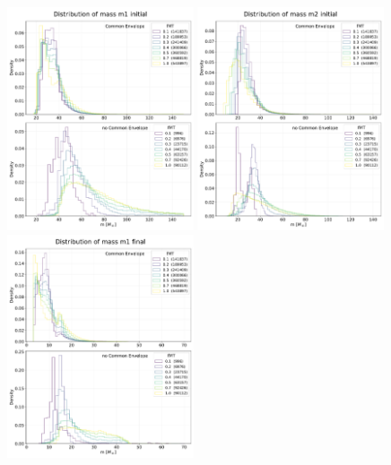 \documentclass[prb,twocolumn,9pt]{revtex4-1}
\begin{document}
\begin{figure}[htp]
    \centering 
    \includegraphics[width=0.49\textwidth]{images/assignment2_1/hist_m1_init_fMT.pdf}
    \hskip 1mm
   \includegraphics[width=0.49\textwidth]{images/assignment2_1/hist_m2_init_fMT.pdf}
    \\
    \vskip 0.7cm
    \includegraphics[width=0.49\textwidth]{images/assignment2_1/hist_m1_fin_fMT.pdf}

\end{figure}
\end{document}
